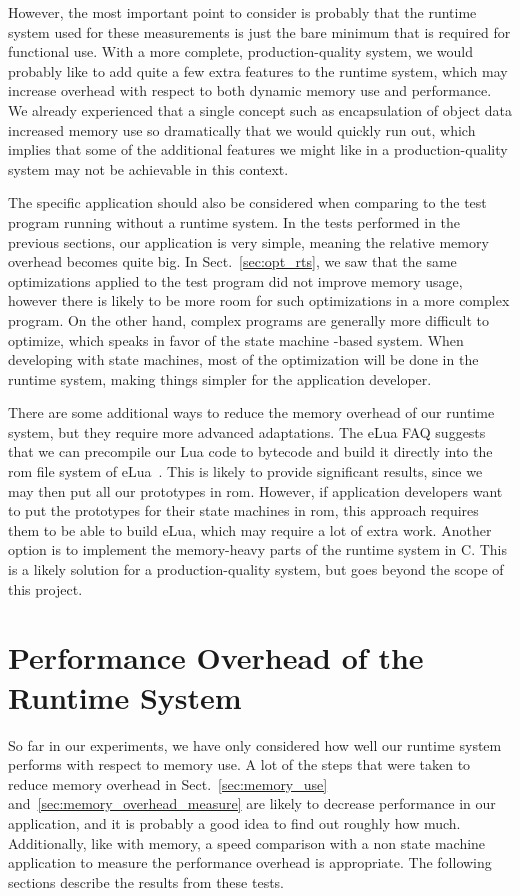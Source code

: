 \noindent
However, the most important point to consider is probably that the runtime system used for these measurements is just the bare minimum that is required for functional use. With a more complete, production-quality system, we would probably like to add quite a few extra features to the runtime system, which may increase overhead with respect to both dynamic memory use and performance. We already experienced that a single concept such as encapsulation of object data increased memory use so dramatically that we would quickly run out, which implies that some of the additional features we might like in a production-quality system may not be achievable in this context.

\noindent
The specific application should also be considered when comparing to the test program running without a runtime system. In the tests performed in the previous sections, our application is very simple, meaning the relative memory overhead becomes quite big. In Sect.~\ref{sec:opt_rts}, we saw that the same optimizations applied to the test program did not improve memory usage, however there is likely to be more room for such optimizations in a more complex program. On the other hand, complex programs are generally more difficult to optimize, which speaks in favor of the state machine -based system. When developing with state machines, most of the optimization will be done in the runtime system, making things simpler for the application developer.

\noindent
There are some additional ways to reduce the memory overhead of our runtime system, but they require more advanced adaptations. The eLua FAQ suggests that we can precompile our Lua code to bytecode and build it directly into the \gls{rom} file system of eLua~\cite{website:elua_faq}. This is likely to provide significant results, since we may then put all our prototypes in \gls{rom}. However, if application developers want to put the prototypes for their state machines in \gls{rom}, this approach requires them to be able to build eLua, which may require a lot of extra work. Another option is to implement the memory-heavy parts of the runtime system in C. This is a likely solution for a production-quality system, but goes beyond the scope of this project.

\FloatBarrier
\section{Performance Overhead of the Runtime System}
\label{sec:performance_overhead}
So far in our experiments, we have only considered how well our runtime system performs with respect to memory use. A lot of the steps that were taken to reduce memory overhead in Sect.~\ref{sec:memory_use} and~\ref{sec:memory_overhead_measure} are likely to decrease performance in our application, and it is probably a good idea to find out roughly how much. Additionally, like with memory, a speed comparison with a non state machine application to measure the performance overhead is appropriate. The following sections describe the results from these tests.

